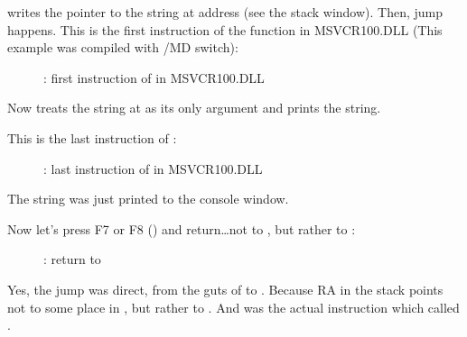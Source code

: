 \clearpage
\MOV writes the pointer to the string at address  (see the stack window).
Then, jump happens.
This is the first instruction of the \printf function in MSVCR100.DLL (This example was compiled with /MD switch): 

\begin{figure}[H]
\centering
{}
\caption{\olly: first instruction of \printf in MSVCR100.DLL}
\label{fig:switch_few_olly6}
\end{figure}

Now \printf treats the string at  as its only argument and prints the string.

\clearpage
This is the last instruction of \printf:

\begin{figure}[H]
\centering
{}
\caption{\olly: last instruction of \printf in MSVCR100.DLL}
\label{fig:switch_few_olly7}
\end{figure}

The string  was just printed to the console window.

\clearpage
Now let's press F7 or F8 (\stepover) and return\dots not to \ttf , but rather to \main:

\begin{figure}[H]
\centering
{}
\caption{\olly: return to \main}
\label{fig:switch_few_olly8}
\end{figure}

Yes, the jump was direct, from the guts of \printf to \main.
Because \ac{RA} in the stack points not to some place in \ttf , but rather to \main.
And \CALL {} was the actual instruction which called \ttf.

